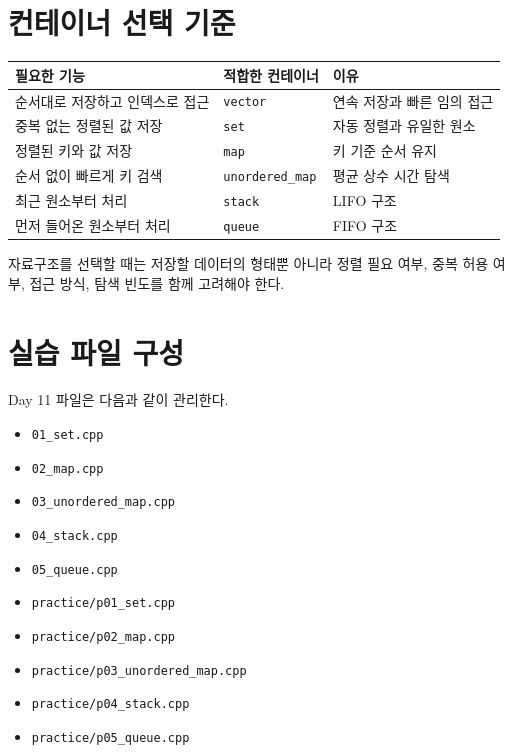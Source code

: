 \documentclass[11pt,a4paper]{article}
\begin{document}
\section{컨테이너 선택 기준}
\begin{center}
\begin{tabular}{lll}
\toprule
필요한 기능 & 적합한 컨테이너 & 이유 \\
\midrule
순서대로 저장하고 인덱스로 접근 & \texttt{vector} & 연속 저장과 빠른 임의 접근 \\
중복 없는 정렬된 값 저장 & \texttt{set} & 자동 정렬과 유일한 원소 \\
정렬된 키와 값 저장 & \texttt{map} & 키 기준 순서 유지 \\
순서 없이 빠르게 키 검색 & \texttt{unordered\_map} & 평균 상수 시간 탐색 \\
최근 원소부터 처리 & \texttt{stack} & LIFO 구조 \\
먼저 들어온 원소부터 처리 & \texttt{queue} & FIFO 구조 \\
\bottomrule
\end{tabular}
\end{center}

\begin{importantbox}
자료구조를 선택할 때는 저장할 데이터의 형태뿐 아니라 정렬 필요 여부, 중복 허용 여부, 접근 방식, 탐색 빈도를 함께 고려해야 한다.
\end{importantbox}

\section{실습 파일 구성}
\begin{practicebox}
Day 11 파일은 다음과 같이 관리한다.
\begin{itemize}[leftmargin=1.5em]
    \item \texttt{01\_set.cpp}
    \item \texttt{02\_map.cpp}
    \item \texttt{03\_unordered\_map.cpp}
    \item \texttt{04\_stack.cpp}
    \item \texttt{05\_queue.cpp}
    \item \texttt{practice/p01\_set.cpp}
    \item \texttt{practice/p02\_map.cpp}
    \item \texttt{practice/p03\_unordered\_map.cpp}
    \item \texttt{practice/p04\_stack.cpp}
    \item \texttt{practice/p05\_queue.cpp}
\end{itemize}
\end{practicebox}
\end{document}
